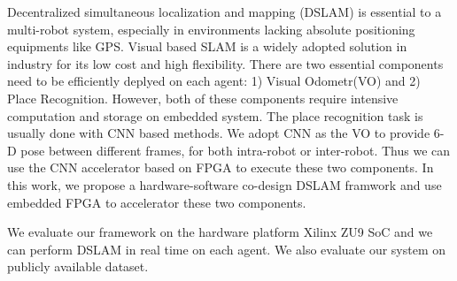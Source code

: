 Decentralized simultaneous localization and mapping (DSLAM) is essential to a multi-robot system, especially in environments lacking absolute positioning equipments like GPS.
Visual based SLAM is a widely adopted solution in industry for its low cost and high flexibility.
There are two essential components need to be efficiently deplyed on each agent: 1) Visual Odometr(VO) and 2) Place Recognition. However, both of these components require intensive computation and storage on embedded system.
The place recognition task is usually done with CNN based methods. We adopt CNN as the VO to provide 6-D pose between different frames, for both intra-robot or inter-robot. Thus we can use the CNN accelerator based on FPGA to execute these two components.
In this work, we propose a hardware-software co-design DSLAM framwork and use embedded FPGA to accelerator these two components.

We evaluate our framework on the hardware platform Xilinx ZU9 SoC and we can perform DSLAM in real time on each agent. We also evaluate our system on publicly  available dataset.